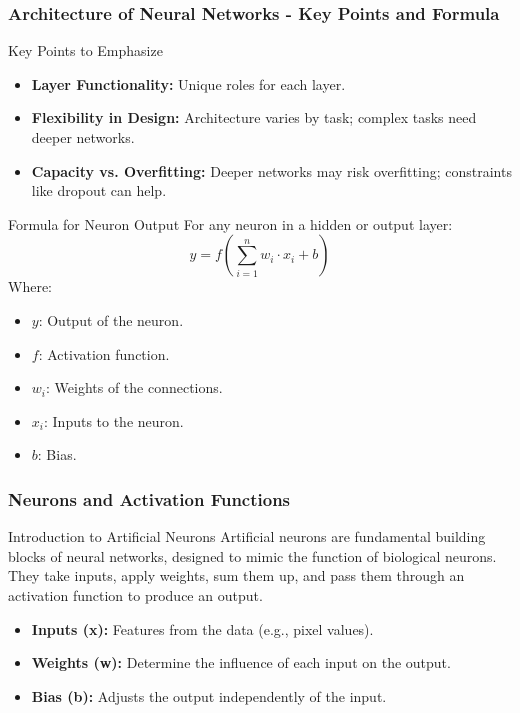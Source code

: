 \documentclass[aspectratio=169]{beamer}
\begin{document}
\begin{frame}[fragile]
    \frametitle{Architecture of Neural Networks - Key Points and Formula}
    \begin{block}{Key Points to Emphasize}
        \begin{itemize}
            \item \textbf{Layer Functionality:} Unique roles for each layer.
            \item \textbf{Flexibility in Design:} Architecture varies by task; complex tasks need deeper networks.
            \item \textbf{Capacity vs. Overfitting:} Deeper networks may risk overfitting; constraints like dropout can help.
        \end{itemize}
    \end{block}
    
    \begin{block}{Formula for Neuron Output}
        For any neuron in a hidden or output layer:
        \begin{equation}
            y = f\left(\sum_{i=1}^{n} w_i \cdot x_i + b\right)
        \end{equation}
        Where:
        \begin{itemize}
            \item $y$: Output of the neuron.
            \item $f$: Activation function.
            \item $w_i$: Weights of the connections.
            \item $x_i$: Inputs to the neuron.
            \item $b$: Bias.
        \end{itemize}
    \end{block}
\end{frame}

\begin{frame}[fragile]
  \frametitle{Neurons and Activation Functions}
  \begin{block}{Introduction to Artificial Neurons}
    Artificial neurons are fundamental building blocks of neural networks, designed to mimic the function of biological neurons. They take inputs, apply weights, sum them up, and pass them through an activation function to produce an output.
  \end{block}

  \begin{itemize}
    \item \textbf{Inputs (x):} Features from the data (e.g., pixel values).
    \item \textbf{Weights (w):} Determine the influence of each input on the output.
    \item \textbf{Bias (b):} Adjusts the output independently of the input.
  \end{itemize}
\end{frame}
\end{document}
